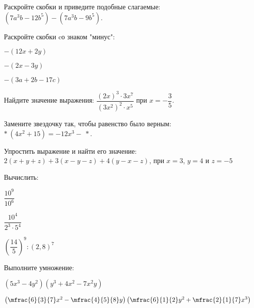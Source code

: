 \begin{exam}
	\begin{listofex}
		\item Раскройте скобки и приведите подобные слагаемые:\quad\( (7a^3b-12b^5)-(7a^3b-9b^5) \).
		\item Раскройте скобки cо знаком "минус":
		\begin{enumcols}[itemcolumns=3]
			\item \( -(12x+2y) \)
			\item \( -(2x-3y) \)
			\item \( -(3a+2b-17c) \)
		\end{enumcols}
		\item Найдите значение выражения: \( \dfrac{(2x)^3\cdot3x^7}{(3x^2)^2\cdot x^5} \) при \( x=-\dfrac{3}{5} \).
		\item Замените звездочку так, чтобы равенство было верным: \( *\:(4x^2+15)=-12x^3-\:* \).
		\item Упростить выражение и найти его значение: \( 2(x+y+z)+3(x-y-z)+4(y-x-z) \), при \( x=3 \), \( y=4 \) и \( z=-5 \)
		\item Вычислить:
		\begin{enumcols}[itemcolumns=3]
			\item \( \dfrac{10^9}{10^6} \)
			\item \( \dfrac{10^4}{2^3\cdot5^4} \)
			\item \( \left( \dfrac{14}{5} \right)^{9}:\left( 2,8 \right)^{7} \)
		\end{enumcols}
		\item Выполните умножение:
		\begin{enumcols}[itemcolumns=2]
			\item \( (5x^3-4y^2)(y^3+4x^2-7x^2y) \)
			\item \( \left( \mfrac{6}{3}{7}x^2-\mfrac{4}{5}{8}y \right)\left( \mfrac{6}{1}{2}y^2+\mfrac{2}{1}{7}x^3 \right) \)
		\end{enumcols}
	\end{listofex}
\end{exam}